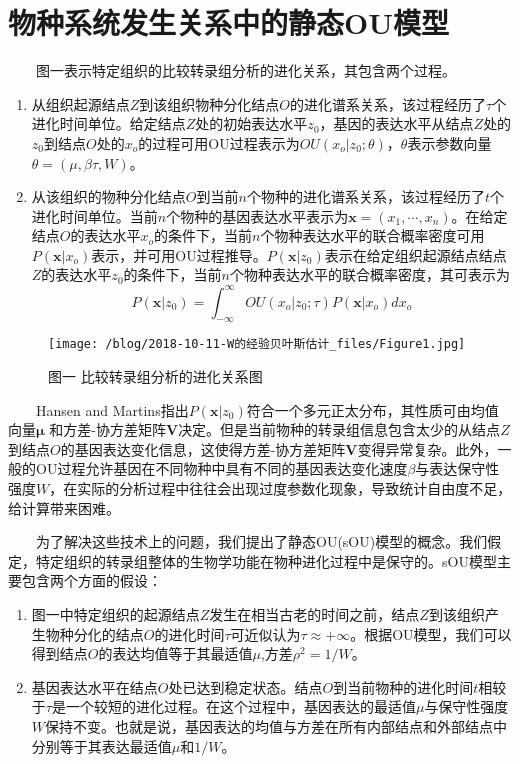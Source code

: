 \documentclass[]{article}
\providecommand{\tightlist}{%
  \setlength{\itemsep}{0pt}\setlength{\parskip}{0pt}}
\begin{document}
\hypertarget{ou}{%
\section{物种系统发生关系中的静态OU模型}\label{ou}}

  图一表示特定组织的比较转录组分析的进化关系，其包含两个过程。

\begin{enumerate}
\def\labelenumi{\arabic{enumi}.}
\tightlist
\item
  从组织起源结点\(Z\)到该组织物种分化结点\(O\)的进化谱系关系，该过程经历了\(\tau\)个进化时间单位。给定结点\(Z\)处的初始表达水平\(z_0\)，基因的表达水平从结点\(Z\)处的\(z_0\)到结点\(O\)处的\(x_o\)的过程可用OU过程表示为\(OU(x_o|z_0;\theta)\)，\(\theta\)表示参数向量\(\theta=(\mu, \beta \tau, W)\)。
\item
  从该组织的物种分化结点\(O\)到当前\(n\)个物种的进化谱系关系，该过程经历了\(t\)个进化时间单位。当前\(n\)个物种的基因表达水平表示为\(\boldsymbol{x}=(x_1,\cdots,x_n)\)。在给定结点\(O\)的表达水平\(x_o\)的条件下，当前\(n\)个物种表达水平的联合概率密度可用\(P(\boldsymbol{x}|x_o)\)表示，并可用OU过程推导。\(P(\boldsymbol{x}|z_0)\)表示在给定组织起源结点结点\(Z\)的表达水平\(z_0\)的条件下，当前\(n\)个物种表达水平的联合概率密度，其可表示为
  \[P(\boldsymbol{x}|z_0)=\int_{-\infty}^{\infty}OU\left(x_o|z_0;\tau\right)P\left(\boldsymbol{x}|x_o\right)dx_o\]
\end{enumerate}

\begin{figure}
\centering
\texttt{[image: /blog/2018-10-11-W的经验贝叶斯估计\_files/Figure1.jpg]}
\caption{图一 比较转录组分析的进化关系图}
\end{figure}

  Hansen and
Martins指出\(P(\boldsymbol{x}|z_0)\)符合一个多元正太分布，其性质可由均值向量\(\boldsymbol{\mu}\)
和方差-协方差矩阵\(\boldsymbol{V}\)决定。但是当前物种的转录组信息包含太少的从结点\(Z\)到结点\(O\)的基因表达变化信息，这使得方差-协方差矩阵\(\boldsymbol{V}\)变得异常复杂。此外，一般的OU过程允许基因在不同物种中具有不同的基因表达变化速度\(\beta\)与表达保守性强度\(W\)，在实际的分析过程中往往会出现过度参数化现象，导致统计自由度不足，给计算带来困难。

  为了解决这些技术上的问题，我们提出了静态OU(sOU)模型的概念。我们假定，特定组织的转录组整体的生物学功能在物种进化过程中是保守的。sOU模型主要包含两个方面的假设：

\begin{enumerate}
\def\labelenumi{\arabic{enumi}.}
\tightlist
\item
  图一中特定组织的起源结点\(Z\)发生在相当古老的时间之前，结点\(Z\)到该组织产生物种分化的结点\(O\)的进化时间\(\tau\)可近似认为\(\tau\approx+\infty\)。根据OU模型，我们可以得到结点\(O\)的表达均值等于其最适值\(\mu\),方差\(\rho^2=1/W\)。
\item
  基因表达水平在结点\(O\)处已达到稳定状态。结点\(O\)到当前物种的进化时间\(t\)相较于\(\tau\)是一个较短的进化过程。在这个过程中，基因表达的最适值\(\mu\)与保守性强度\(W\)保持不变。也就是说，基因表达的均值与方差在所有内部结点和外部结点中分别等于其表达最适值\(\mu\)和\(1/W\)。
\end{enumerate}
\end{document}
